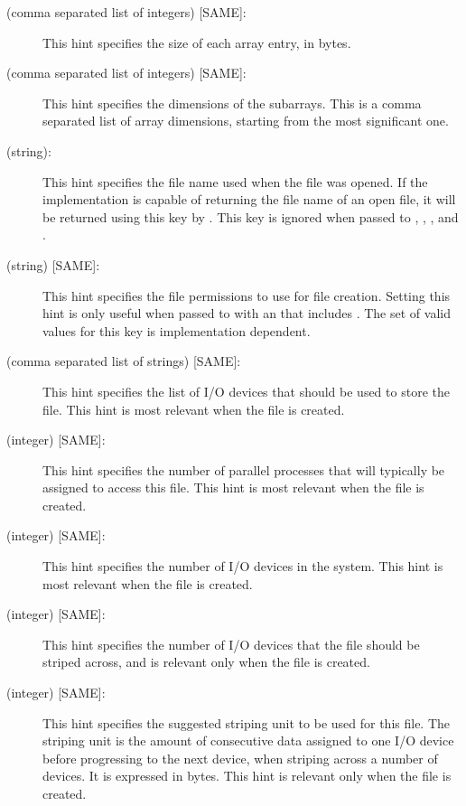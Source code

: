 \begin{description}
\item[ (comma separated list of integers) {[SAME]}:]
This hint specifies the size of each array entry, in bytes.

\item[ (comma separated list of integers) {[SAME]}:]
This hint specifies the dimensions of the subarrays.
This is a comma separated list of array dimensions,
starting from the most significant one.

\item[ (string):]
This hint specifies the file name used when the file was opened.
If the implementation is capable of returning the file name
of an open file,
it will be returned using this key by .
This key is ignored when passed to
, , 
, and .

\item[ (string) {[SAME]}:]
This hint specifies the file permissions to use for file creation.
Setting this hint is only useful when passed to 
with an  that includes .
The set of valid values for this key is implementation dependent.

\item[ (comma separated list of strings) {[SAME]}:]
This hint specifies the list of I/O devices
that should be used to store the file.
This hint is most relevant when the file is created.

\item[ (integer) {[SAME]}:]
This hint specifies the number of parallel processes that will
typically be assigned to access this file.
This hint is most relevant when the file is created.

\item[ (integer) {[SAME]}:]
This hint specifies the number of I/O devices in the system.
This hint is most relevant when the file is created.
\item[ (integer) {[SAME]}:]
This hint specifies the number of I/O devices
that the file should be striped across, and is
relevant only when the file is created.

\item[ (integer) {[SAME]}:]
This hint specifies the suggested striping unit to be used for this file.
The striping unit is the amount
of consecutive data assigned to one I/O device
before progressing to the next device,
when striping across a number of devices.
It is expressed in bytes.
This hint is relevant only when the file is created.


\end{description}
